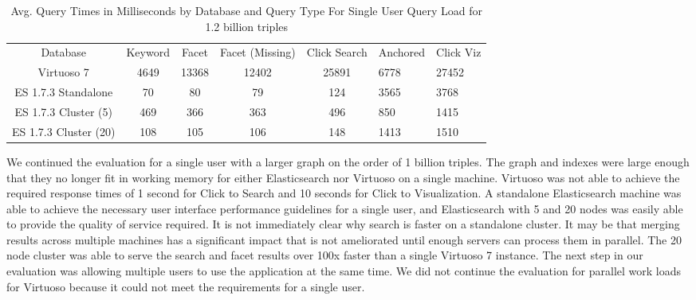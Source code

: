 \begin{table} 
    \begin{tabular}{ c c c c c }
        Database & Keyword & Facet & Facet (Missing) & Click Search & Anchored & Click Viz \\ 
        Virtuoso 7 & 4649 & 13368 & 12402 & 25891 & 6778 &  27452 \\ 
        ES 1.7.3 Standalone & 70 & 80 & 79 & 124 & 3565 & 3768 \\ 
        ES 1.7.3 Cluster (5) & 469 & 366 & 363 & 496 & 850 & 1415 \\ 
        ES 1.7.3 Cluster (20) & 108 & 105 & 106 & 148 & 1413 & 1510 \\ 
    \end{tabular} 
    \caption{Avg. Query Times in Milliseconds by Database and Query Type For Single User Query Load for 1.2 billion triples}
    \label{table:qt_single_user_1b}
\end{table}

We continued the evaluation for a single user with a larger graph on the order of 1 billion triples.  
The graph and indexes were large enough that they no longer fit in working memory for either Elasticsearch nor Virtuoso on a single machine.
Virtuoso was not able to achieve the required response times of 1 second for Click to Search and 10 seconds for Click to Visualization.
A standalone Elasticsearch machine was able to achieve the necessary user interface performance guidelines for a single user, and Elasticsearch with 5 and 20 nodes was easily able to provide the quality of service required.
It is not immediately clear why search is faster on a standalone cluster.
It may be that merging results across multiple machines has a significant impact that is not ameliorated until enough servers can process them in parallel. 
The 20 node cluster was able to serve the search and facet results over 100x faster than a single Virtuoso 7 instance. 
The next step in our evaluation was allowing multiple users to use the application at the same time.
We did not continue the evaluation for parallel work loads for Virtuoso because it could not meet the requirements for a single user.

